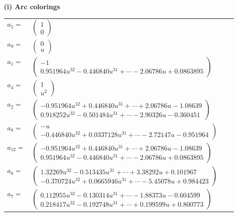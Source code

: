 \documentclass[1p]{elsarticle_modified}
\theoremstyle{definition}
\begin{document}
\flushleft \textbf{(i) Arc colorings}\\
\begin{tabular}{m{7pt} m{180pt} m{7pt} m{180pt} }
\flushright $a_{5}=$&$\begin{pmatrix}1\\0\end{pmatrix}$ \\
\flushright $a_{9}=$&$\begin{pmatrix}0\\u\end{pmatrix}$ \\
\flushright $a_{1}=$&$\begin{pmatrix}-1\\0.951964 u^{32}-0.446840 u^{31}+\cdots-2.06786 u+0.0863895\end{pmatrix}$ \\
\flushright $a_{4}=$&$\begin{pmatrix}1\\u^2\end{pmatrix}$ \\
\flushright $a_{2}=$&$\begin{pmatrix}-0.951964 u^{32}+0.446840 u^{31}+\cdots+2.06786 u-1.08639\\0.918252 u^{32}-0.501484 u^{31}+\cdots-2.90326 u-0.360451\end{pmatrix}$ \\
\flushright $a_{8}=$&$\begin{pmatrix}- u\\-0.446840 u^{32}+0.0337128 u^{31}+\cdots-2.72147 u-0.951964\end{pmatrix}$ \\
\flushright $a_{12}=$&$\begin{pmatrix}-0.951964 u^{32}+0.446840 u^{31}+\cdots+2.06786 u-1.08639\\0.951964 u^{32}-0.446840 u^{31}+\cdots-2.06786 u+0.0863895\end{pmatrix}$ \\
\flushright $a_{6}=$&$\begin{pmatrix}1.32269 u^{32}-0.513435 u^{31}+\cdots+3.38292 u+0.101967\\-0.370724 u^{32}+0.0665946 u^{31}+\cdots-5.45078 u+0.984423\end{pmatrix}$ \\
\flushright $a_{7}=$&$\begin{pmatrix}0.112955 u^{32}-0.130314 u^{31}+\cdots-1.88373 u-0.604599\\0.218417 u^{32}-0.192748 u^{31}+\cdots+0.199599 u+0.800773\end{pmatrix}$ \\

\end{tabular}
\end{document}
